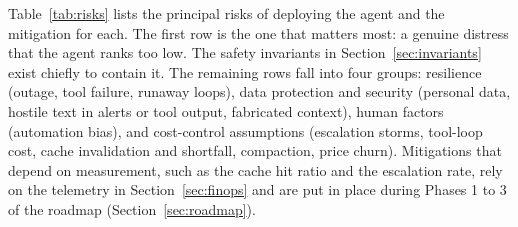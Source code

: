 \documentclass[conference]{IEEEtran}
\begin{document}
Table~\ref{tab:risks} lists the principal risks of deploying the agent and the mitigation for each. The first row is the one that matters most: a genuine distress that the agent ranks too low. The safety invariants in Section~\ref{sec:invariants} exist chiefly to contain it. The remaining rows fall into four groups: resilience (outage, tool failure, runaway loops), data protection and security (personal data, hostile text in alerts or tool output, fabricated context), human factors (automation bias), and cost-control assumptions (escalation storms, tool-loop cost, cache invalidation and shortfall, compaction, price churn). Mitigations that depend on measurement, such as the cache hit ratio and the escalation rate, rely on the telemetry in Section~\ref{sec:finops} and are put in place during Phases 1 to 3 of the roadmap (Section~\ref{sec:roadmap}).
\end{document}
